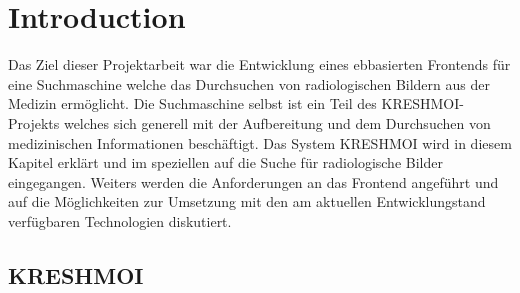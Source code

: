 
\section{Introduction}
\label{sec:introduction}
Das Ziel dieser Projektarbeit war die Entwicklung eines ebbasierten Frontends für eine Suchmaschine welche das Durchsuchen von radiologischen Bildern aus der Medizin ermöglicht.
Die Suchmaschine selbst ist ein Teil des KRESHMOI-Projekts  welches sich generell mit der Aufbereitung und dem Durchsuchen von medizinischen Informationen beschäftigt.
Das System KRESHMOI wird in diesem Kapitel erklärt und im speziellen auf die Suche für radiologische Bilder eingegangen.
Weiters werden die Anforderungen an das Frontend angeführt und auf die Möglichkeiten zur Umsetzung mit den am aktuellen Entwicklungstand verfügbaren Technologien diskutiert.

\subsection{KRESHMOI}
\label{sec:Motivation}

